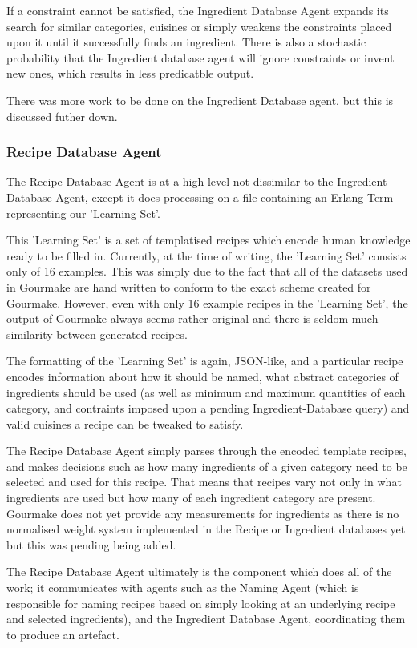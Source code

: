 \documentclass[9pt,titlepage,a4paper]{extarticle}
\begin{document}
    If a constraint cannot be satisfied, the Ingredient Database Agent expands its search for similar categories,
    cuisines or simply weakens the constraints placed upon it until it successfully finds an ingredient. There is
    also a stochastic probability that the Ingredient database agent will ignore constraints or invent new ones,
    which results in less predicatble output. 

    There was more work to be done on the Ingredient Database agent, but this is discussed futher down.

\subsubsection{Recipe Database Agent}
    The Recipe Database Agent is at a high level not dissimilar to the Ingredient Database Agent, except it does
    processing on a file containing an Erlang Term representing our 'Learning Set'. 

    This 'Learning Set' is a set of templatised recipes which encode human knowledge ready to be filled in. Currently,
    at the time of writing, the 'Learning Set' consists only of 16 examples. This was simply due to the fact that
    all of the datasets used in Gourmake are hand written to conform to the exact scheme created for Gourmake. However,
    even with only 16 example recipes in the 'Learning Set', the output of Gourmake always seems rather original and
    there is seldom much similarity between generated recipes.

    The formatting of the 'Learning Set' is again, JSON-like, and a particular recipe encodes information about how it
    should be named, what abstract categories of ingredients should be used (as well as minimum and maximum quantities
    of each category, and contraints imposed upon a pending Ingredient-Database query) and valid cuisines a recipe
    can be tweaked to satisfy.

    The Recipe Database Agent simply parses through the encoded template recipes, and makes decisions such as how many
    ingredients of a given category need to be selected and used for this recipe. That means that recipes vary not only 
    in what ingredients are used but how many of each ingredient category are present. Gourmake does not yet provide
    any measurements for ingredients as there is no normalised weight system implemented in the Recipe or Ingredient
    databases yet but this was pending being added.

    The Recipe Database Agent ultimately is the component which does all of the work; it communicates with agents such
    as the Naming Agent (which is responsible for naming recipes based on simply looking at an underlying recipe and
    selected ingredients), and the Ingredient Database Agent, coordinating them to produce an artefact.
\end{document}
